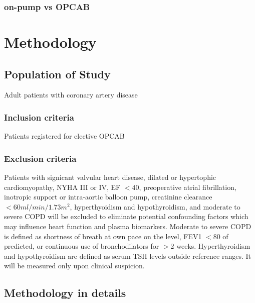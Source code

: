 \documentclass[14pt,a4paper,onecolumn]{article}
\begin{document}
\subsubsection{on-pump vs OPCAB}


\clearpage
\section{Methodology}

\subsection{Population of Study}

Adult patients with coronary artery disease

\subsubsection{Inclusion criteria}

Patients registered for elective OPCAB

\subsubsection{Exclusion criteria}

Patients with signicant valvular heart disease, dilated or hypertophic cardiomyopathy, NYHA III or IV, EF $< 40$, preoperative atrial fibrillation, inotropic support or intra-aortic balloon pump, creatinine clearance $< 60 ml/min/1.73 m^2$, hyperthyoidism and hypothyroidism, and moderate to severe COPD will be excluded to eliminate potential confounding factors which may influence heart function and plasma biomarkers.  Moderate to severe COPD is defined as shortness of breath at own pace on the level, FEV1 $< 80$ of predicted, or continuous use of bronchodilators for $> 2$ weeks.  Hyperthyroidism and hypothyroidism are defined as serum TSH levels outside reference ranges.  It will be measured only upon clinical suspicion.

\subsection{Methodology in details}
\end{document}
